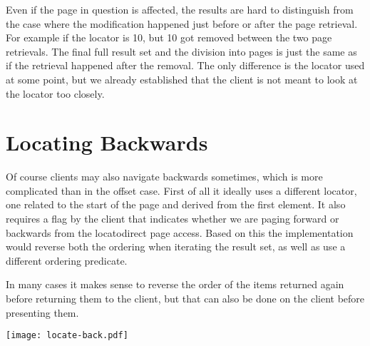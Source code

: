 \documentclass[11pt,a4paper]{article}
\begin{document}
\begin{multicols}{2}
Even if the page in question is affected, the results are hard to distinguish
from the case where the modification happened just before or after the page
retrieval. For example if the locator is 10, but 10 got removed between the two
page retrievals. The final full result set and the division into pages is just
the same as if the retrieval happened after the removal. The only difference is
the locator used at some point, but we already established that the client is
not meant to look at the locator too closely.


\section*{Locating Backwards}

Of course clients may also navigate backwards sometimes, which is more
complicated than in the offset case. First of all it ideally uses a different
locator, one related to the start of the page and derived from the first
element. It also requires a flag by the client that indicates whether we are
paging forward or backwards from the locatodirect page access. Based on this the
implementation would reverse both the ordering when iterating the result set, as
well as use a different ordering predicate. %

In many cases it makes sense to reverse the
order of the items returned again before returning them to the client, but that
can also be done on the client before presenting them. 

\texttt{[image: locate-back.pdf]}





\end{multicols}
\end{document}
